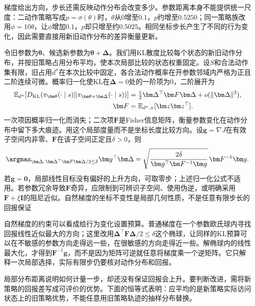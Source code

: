 梯度给出方向，步长还需反映动作分布会改变多少。参数距离本身不能提供统一尺度：二动作策略写成$p=\sigma(\theta)$时，$\theta$从0增至$0.1$，$p$约增至$0.5250$；同一策略族改用$\phi=10\theta$，让$\phi$增加$0.1$，$p$却只增至约$0.5025$。相同坐标步长产生了不同的行为变化，因此需要直接用新旧动作分布的差异衡量更新。

令旧参数为$\bm\theta$、候选新参数为$\bm\theta+\bm\Delta$。我们用KL散度比较每个状态的新旧动作分布，并按旧策略占用分布平均，使本次局部比较的状态权重固定。设$S$和合法动作集有限，旧占用$d^\pi$在本次比较中固定，各合法动作概率在开参数邻域内严格为正且二阶连续可微。概率归一化使KL在$\bm\Delta=0$处的一阶项为0，二阶展开为
\begin{align}
  \mathbb E_{d^\pi}\!
    \left[D_{\mathrm{KL}}
       (\pi_{\bm\theta}(\cdot\mid s)
           \Vert\pi_{\bm\theta+\bm\Delta}(\cdot\mid s))\right]
    &=\tfrac12\bm\Delta^\top\bm F\bm\Delta
         +o(\lVert\bm\Delta\rVert^2), \notag\\
  \bm F&=\mathbb E_{d^\pi,\pi}[\bm z\bm z^\top].
  \label{eq:rl-learning-fisher}
\end{align}
一次项因概率归一化而消失；二次项$\bm F$是Fisher信息矩阵，衡量参数变化在动作分布中留下多大痕迹。用这个局部度量而不是坐标长度比较方向。设$\bm g=\nabla J$在有效子空间内非零、$\bm F$在该子空间正定且$\delta>0$，则
\[
  \argmax_{\bm\Delta:\,\bm\Delta^\top\bm F\bm\Delta/2\leq\delta}
       \bm g^\top\bm\Delta
     =
     \sqrt{\frac{2\delta}{\bm g^\top\bm F^{-1}\bm g}}\,
       \bm F^{-1}\bm g.
\]
若$\bm g=\bm0$，局部线性目标没有偏好的上升方向，可取零步；上述归一化公式不适用。若参数冗余导致$\bm F$奇异，应限制到可辨识子空间、使用伪逆，或明确采用$\bm F+\xi\bm I$的阻尼近似。自然梯度的坐标不变性是局部几何性质，不是任意有限步长的回报保证

自然梯度的约束可以看成给行为变化设置预算。普通梯度在一个参数欧氏球内寻找回报线性近似最大的方向；这里改用$\bm\Delta^\top\bm F\bm\Delta/2\leq\delta$这个椭球，让同样的KL预算可以在不敏感的参数方向走得远一些，在很敏感的方向走得近一些。解椭球内的线性最大化，才得到$\bm F^{-1}\bm g$，而不是因为矩阵可逆就任意将梯度乘一个逆矩阵。它只解释一次局部选择，实际有限步仍要核对动作分布和回报。

局部分布距离说明如何计量一步，却还没有保证回报会上升。要判断改进，需将新策略的回报差写成可评价的优势。下面的恒等式表明：应平均的是新策略实际访问状态上的旧策略优势，不能任意用旧策略轨迹的抽样分布替换。

